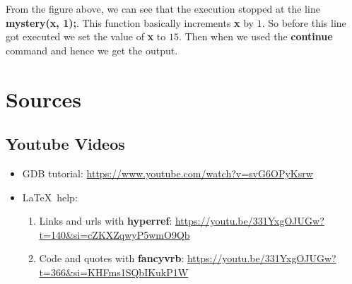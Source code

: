 \documentclass{article}
\begin{document}
From the figure above, we can see that the execution stopped at the line \textbf{mystery(x, 1);}. This function basically increments \textbf{x} by $1$. So before this line got executed we set the value of \textbf{x} to $15$. Then when we used the \textbf{continue} command and hence we get the output.

\newpage
\section{Sources}
\subsection{Youtube Videos}
\begin{itemize}
\item GDB tutorial: \url{https://www.youtube.com/watch?v=svG6OPyKsrw}
\item \LaTeX\ help:
\begin{enumerate}[label=$\bullet$]
\item Links and urls with \textbf{hyperref}: \url{https://youtu.be/331YxgOJUGw?t=140&si=cZKXZqwyP5wmO9Qb}
\item Code and quotes with \textbf{fancyvrb}: \url{https://youtu.be/331YxgOJUGw?t=366&si=KHFms1SQbIKukP1W}
\end{enumerate}
\end{itemize}
\end{document}
